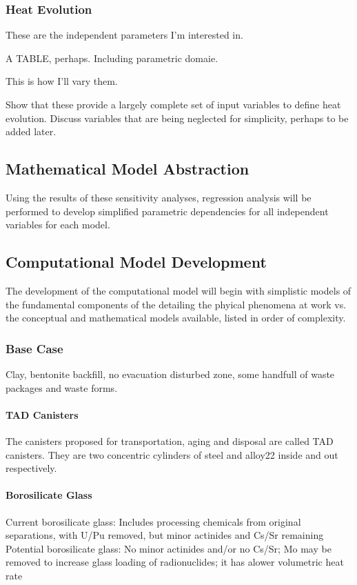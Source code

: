 \subsubsection{Heat Evolution}

These are the independent parameters I'm interested in.

A TABLE, perhaps. Including parametric domaie.

This is how I'll vary them.

Show that these provide a largely complete set of input variables to define 
heat evolution. Discuss variables that are being neglected for simplicity, 
perhaps to be added later. 

\subsection{Mathematical Model Abstraction}

Using the results of these sensitivity analyses, regression analysis will be 
performed to develop simplified parametric dependencies for all independent 
variables for each model. 

\subsection{Computational Model Development}

The development of the computational model will begin with simplistic models of  
the fundamental components of the detailing the phyical phenomena at work vs. the conceptual and 
mathematical models available, listed in order of complexity.


\subsubsection{Base Case}

Clay, bentonite backfill, no evacuation disturbed zone, some handfull of waste 
packages and waste forms.




\paragraph{TAD Canisters} The canisters proposed for transportation, aging and 
disposal are called TAD canisters.  They are two concentric cylinders of steel 
and alloy22 inside and out respectively. 


\paragraph{Borosilicate Glass} Current borosilicate glass: Includes processing 
chemicals from original separations, with U/Pu removed, but minor actinides and 
Cs/Sr remaining Potential borosilicate glass: No minor actinides and/or no 
Cs/Sr; Mo may be removed to increase glass loading of radionuclides; it has 
alower volumetric heat rate


